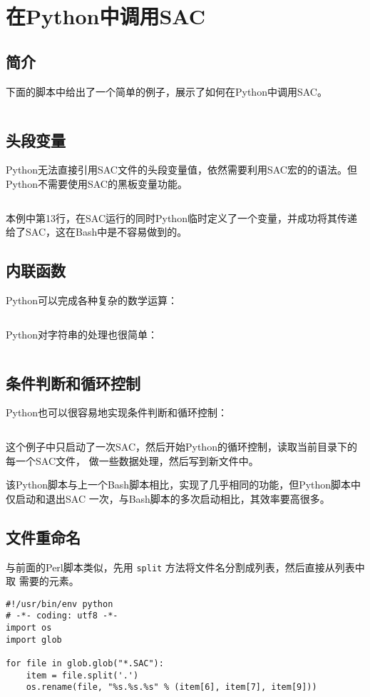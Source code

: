 \section{在Python中调用SAC}
\label{sec:sac-python}

\subsection{简介}
下面的脚本中给出了一个简单的例子，展示了如何在Python中调用SAC。
\inputminted{python}{./call-in-script/simple-script.py}

\subsection{头段变量}
Python无法直接引用SAC文件的头段变量值，依然需要利用SAC宏的的语法。但Python不需要使用SAC的黑板变量功能。
\inputminted{python}{./call-in-script/variables.py}
本例中第13行，在SAC运行的同时Python临时定义了一个变量，并成功将其传递给了SAC，这在Bash中是不容易做到的。

\subsection{内联函数}
Python可以完成各种复杂的数学运算：
\inputminted{python}{./call-in-script/arithmetic-functions.py}

Python对字符串的处理也很简单：
\inputminted{python}{./call-in-script/string-functions.py}

\subsection{条件判断和循环控制}
Python也可以很容易地实现条件判断和循环控制：
\inputminted{python}{./call-in-script/do-loops.py}
这个例子中只启动了一次SAC，然后开始Python的循环控制，读取当前目录下的每一个SAC文件，
做一些数据处理，然后写到新文件中。

该Python脚本与上一个Bash脚本相比，实现了几乎相同的功能，但Python脚本中仅启动和退出SAC
一次，与Bash脚本的多次启动相比，其效率要高很多。

\subsection{文件重命名}
\label{subsec:rename-in-python}
与前面的Perl脚本类似，先用 \texttt{split} 方法将文件名分割成列表，然后直接从列表中取
需要的元素。
\begin{verbatim}
#!/usr/bin/env python
# -*- coding: utf8 -*-
import os
import glob

for file in glob.glob("*.SAC"):
    item = file.split('.')
    os.rename(file, "%s.%s.%s" % (item[6], item[7], item[9]))
\end{verbatim}
